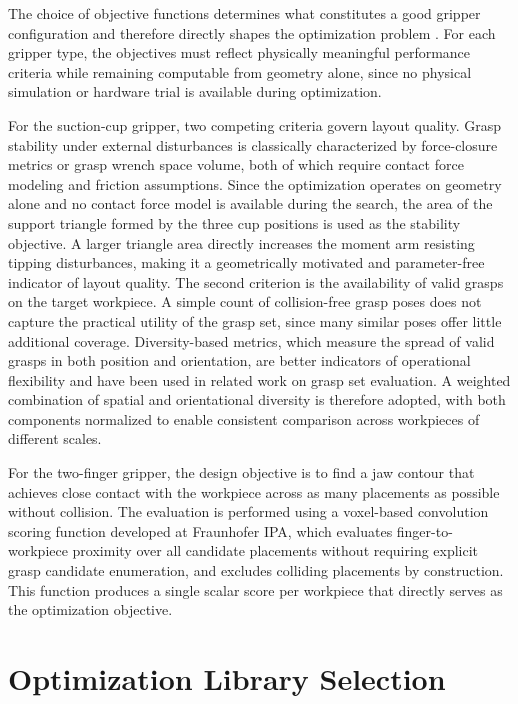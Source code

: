 The choice of objective functions determines what constitutes a good gripper configuration and therefore directly shapes the optimization problem
\cite{Todescato,Wolniakowski2017Task}. For each gripper type, the objectives must reflect physically meaningful performance criteria while remaining
computable from geometry alone, since no physical simulation or hardware trial is available during optimization.

For the suction-cup gripper, two competing criteria govern layout quality. Grasp stability under external disturbances is classically characterized by
force-closure metrics or grasp wrench space volume, both of which require contact force modeling and friction assumptions\cite{Weisz2012Pose}. Since
the optimization operates on geometry alone and no contact force model is available during the search, the area of the support triangle formed by the
three cup positions is used as the stability objective. A larger triangle area directly increases the moment arm resisting tipping disturbances,
making it a geometrically motivated and parameter-free indicator of layout quality\cite{madan2022realrobotchallenge2021}. The second criterion is the
availability of valid grasps on the target workpiece\cite{Bo2023A}. A simple count of collision-free grasp poses does not capture the practical
utility of the grasp set, since many similar poses offer little additional coverage. Diversity-based metrics, which measure the spread of valid grasps
in both position and orientation, are better indicators of operational flexibility and have been used in related work on grasp set
evaluation\cite{Pinskier2024Diversity-Based}. A weighted combination of spatial and orientational diversity is therefore adopted, with both components
normalized to enable consistent comparison across workpieces of different scales.

For the two-finger gripper, the design objective is to find a jaw contour that achieves close contact with the workpiece across as many placements as
possible without collision\cite{Ko2020A}. The evaluation is performed using a voxel-based convolution scoring function
developed at Fraunhofer IPA, which evaluates finger-to-workpiece proximity over all candidate placements without requiring explicit grasp candidate
enumeration, and excludes colliding placements by construction\cite{snuggle_pack}. This function produces a single scalar score per workpiece that directly serves as the
optimization objective.

\section{Optimization Library Selection}
\label{sec:methodology_library}

